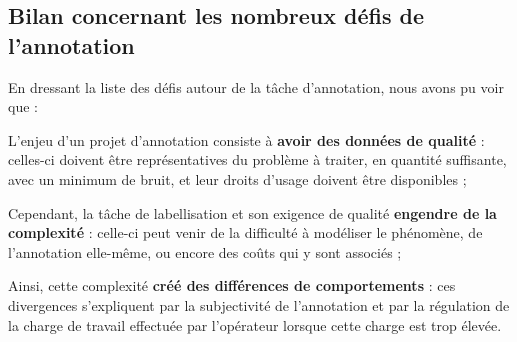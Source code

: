 	
	\subsection{Bilan concernant les nombreux défis de l'annotation}
	\label{section:2.3.4-DEFIS-ANNOTATION-BILAN}
	
	\begin{leftBarSummary}
		En dressant la liste des défis autour de la tâche d'annotation, nous avons pu voir que :
		\begin{todolist}
			\item[\itemok] L'enjeu d'un projet d'annotation consiste à \textbf{avoir des données de qualité} :
			celles-ci doivent être représentatives du problème à traiter, en quantité suffisante, avec un minimum de bruit, et leur droits d'usage doivent être disponibles ;
			\item[\itemok] Cependant, la tâche de labellisation et son exigence de qualité \textbf{engendre de la complexité} :
			celle-ci peut venir de la difficulté à modéliser le phénomène, de l'annotation elle-même, ou encore des coûts qui y sont associés ;
			\item[\itemok] Ainsi, cette complexité \textbf{créé des différences de comportements} : ces divergences s'expliquent par la subjectivité de l'annotation et par la régulation de la charge de travail effectuée par l'opérateur lorsque cette charge est trop élevée.
		\end{todolist}
	\end{leftBarSummary}